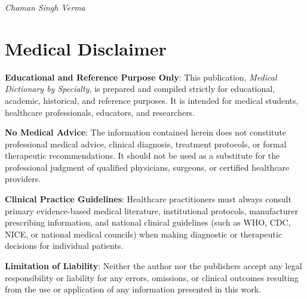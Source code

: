 \documentclass[11pt,twocolumn,twoside]{book}
\begin{document}
\medskip

\noindent\textit{Chaman Singh Verma}


\chapter*{Medical Disclaimer}

\noindent \textbf{Educational and Reference Purpose Only}: This publication, \textit{Medical Dictionary by Specialty}, is prepared and compiled strictly for educational, academic, historical, and reference purposes. It is intended for medical students, healthcare professionals, educators, and researchers.

\medskip

\noindent \textbf{No Medical Advice}: The information contained herein does not constitute professional medical advice, clinical diagnosis, treatment protocols, or formal therapeutic recommendations. It should not be used as a substitute for the professional judgment of qualified physicians, surgeons, or certified healthcare providers.

\medskip

\noindent \textbf{Clinical Practice Guidelines}: Healthcare practitioners must always consult primary evidence-based medical literature, institutional protocols, manufacturer prescribing information, and national clinical guidelines (such as WHO, CDC, NICE, or national medical councils) when making diagnostic or therapeutic decisions for individual patients.

\medskip

\noindent \textbf{Limitation of Liability}: Neither the author nor the publishers accept any legal responsibility or liability for any errors, omissions, or clinical outcomes resulting from the use or application of any information presented in this work.

\newpage
\tableofcontents
\twocolumn
\mainmatter
\setcounter{tocdepth}{0}
\end{document}
